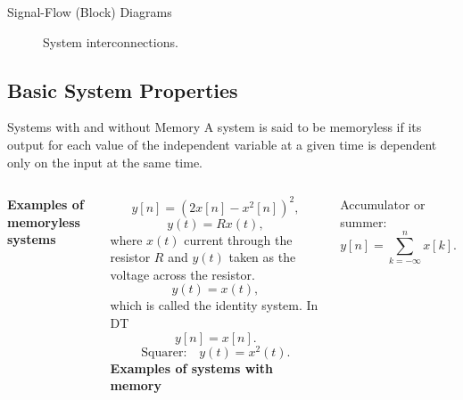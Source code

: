 \begin{frame}[plain]{Signal-Flow (Block) Diagrams}
    \begin{figure}
        \centering
        
        \caption{System interconnections.}\label{fi:sys_interconnections}
    \end{figure}
\end{frame}

\subsection{Basic System Properties}

\begin{frame}{Systems with and without Memory}
    A system is said to be \alert{memoryless}  if its output for each value of the independent variable at a given time is dependent only on the input at the same time.
    \vspace{0.1in}
    \par
    \begin{columns}
            \textbf{Examples of memoryless systems}\par
            \begin{equation*}
                y[n] = (2x[n] - x^2[n])^2,
            \end{equation*}
            \begin{equation*}
                y(t) = Rx(t),
            \end{equation*}
            where $x(t)$ current through the resistor $R$ and $y(t)$ taken as the voltage across the resistor.
            \begin{equation*}
                y(t) = x(t),
            \end{equation*}
            which is called the \alert{identity system}. In DT
            \begin{equation*}
                y[n] = x[n].
            \end{equation*}
            \begin{equation*}
                \text{Squarer:}\quad y(t) = x^2(t).
            \end{equation*}
            \textbf{Examples of systems with memory}\par
            Accumulator or summer:
            \begin{equation*}
                y[n] = \sum_{k=-\infty}^{n}x[k].
            \end{equation*}

\end{columns}
\end{frame}
